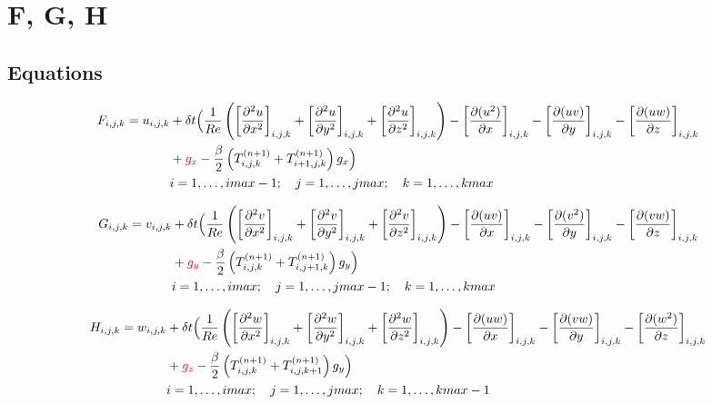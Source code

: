\documentclass[10pt]{article}
\begin{document}
\section{F, G, H}

\subsection{Equations}

\begin{equation}
\begin{split}
F_{i,j,k} =
u_{i,j,k} & + \delta t \Bigl(
\frac{1}{Re} \left( \left[\frac{\partial^2 u}{\partial x^2}\right]_{i,j,k} + \left[\frac{\partial^2 u}{\partial y^2}\right]_{i,j,k} + \left[\frac{\partial^2 u}{\partial z^2}\right]_{i,j,k} \right) - 
\left[\frac{\partial(u^2)}{\partial x}\right]_{i,j,k} -\left[\frac{\partial (uv)}{\partial y}\right]_{i,j,k} - 
\left[\frac{\partial (uw)}{\partial z}\right]_{i,j,k}\\
& + \textcolor{red}{g_x} - \frac{\beta}{2} \left( T^{(n+1)}_{i,j,k} + T^{(n+1)}_{i+1,j,k} \right) g_x \Bigr)\\
& i = 1,\ldots,imax-1; \quad j = 1,\ldots,jmax; \quad k = 1,\ldots,kmax
\end{split}
\end{equation}

\begin{equation}
\begin{split}
G_{i,j,k} = 
v_{i,j,k} & + \delta t \Bigl(
\frac{1}{Re} \left( \left[\frac{\partial^2 v}{\partial x^2}\right]_{i,j,k} + \left[\frac{\partial^2 v}{\partial y^2}\right]_{i,j,k} + \left[\frac{\partial^2 v}{\partial z^2}\right]_{i,j,k} \right) - 
\left[\frac{\partial(uv)}{\partial x}\right]_{i,j,k} -\left[\frac{\partial (v^2)}{\partial y}\right]_{i,j,k} - 
\left[\frac{\partial (vw)}{\partial z}\right]_{i,j,k}\\
& + \textcolor{red}{g_y} - \frac{\beta}{2} \left( T^{(n+1)}_{i,j,k} + T^{(n+1)}_{i,j+1,k} \right) g_y \Bigr)\\
& i = 1,\ldots,imax; \quad j = 1,\ldots,jmax-1; \quad k = 1,\ldots,kmax
\end{split}
\end{equation}

\begin{equation}
\begin{split}
H_{i,j,k} = 
w_{i,j,k} & + \delta t \Bigl(
\frac{1}{Re} \left( \left[\frac{\partial^2 w}{\partial x^2}\right]_{i,j,k} + \left[\frac{\partial^2 w}{\partial y^2}\right]_{i,j,k} + \left[\frac{\partial^2 w}{\partial z^2}\right]_{i,j,k} \right) - 
\left[\frac{\partial(uw)}{\partial x}\right]_{i,j,k} -\left[\frac{\partial (vw)}{\partial y}\right]_{i,j,k} - 
\left[\frac{\partial (w^2)}{\partial z}\right]_{i,j,k}\\
& + \textcolor{red}{g_z} - \frac{\beta}{2} \left( T^{(n+1)}_{i,j,k} + T^{(n+1)}_{i,j,k+1} \right) g_y \Bigr)\\
& i = 1,\ldots,imax; \quad j = 1,\ldots,jmax; \quad k = 1,\ldots,kmax-1
\end{split}
\end{equation}
\end{document}

